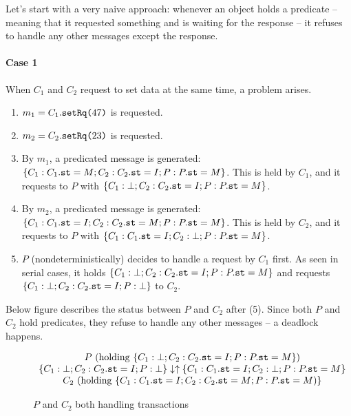 \documentclass[format=manuscript]{acmart}
\begin{document}
Let's start with a very naive approach: whenever an object holds a predicate --
meaning that it requested something and is waiting for the response -- it
refuses to handle any other messages except the response.

\paragraph{Case 1}\label{concurrent-case1}
When $C_1$ and $C_2$ request to set data at the same time, a problem arises.

\begin{enumerate}
\item $m_1 = C_1.\texttt{setRq(}47\texttt{)}$ is requested.
\item $m_2 = C_2.\texttt{setRq(}23\texttt{)}$ is requested.
\item By $m_1$, a predicated message is generated: $\{ C_1: C_1.\texttt{st} = M; C_2:
  C_2.\texttt{st} = I; P: P.\texttt{st} = M \}$. This is held by $C_1$, and it requests to
  $P$ with $\{ C_1: \bot; C_2: C_2.\texttt{st} = I; P: P.\texttt{st} = M \}$.
\item By $m_2$, a predicated message is generated: $\{ C_1: C_1.\texttt{st} = I; C_2:
  C_2.\texttt{st} = M; P: P.\texttt{st} = M \}$. This is held by $C_2$, and it requests to
  $P$ with $\{ C_1: C_1.\texttt{st} = I; C_2: \bot; P: P.\texttt{st} = M \}$.
\item $P$ (nondeterministically) decides to handle a request by $C_1$ first. As
  seen in serial cases, it holds $\{ C_1: \bot; C_2: C_2.\texttt{st} = I; P: P.\texttt{st}
  = M \}$ and requests $\{ C_1: \bot; C_2: C_2.\texttt{st} = I; P: \bot \}$ to $C_2$.
\end{enumerate}

Below figure describes the status between $P$ and $C_2$ after (5). Since both
$P$ and $C_2$ hold predicates, they refuse to handle any other messages -- a
deadlock happens.

\begin{figure}[h]
  \begin{math}
    \begin{array}{c}
      P\ (\textrm{holding}\ \{ C_1: \bot; C_2: C_2.\texttt{st} = I; P: P.\texttt{st} = M \}) \\
      \{ C_1: \bot; C_2: C_2.\texttt{st} = I; P: \bot \} \downarrow
      \uparrow \{ C_1: C_1.\texttt{st} = I; C_2: \bot; P: P.\texttt{st} = M \} \\
      C_2\ (\textrm{holding}\ \{ C_1: C_1.\texttt{st} = I; C_2: C_2.\texttt{st} = M; P: P.\texttt{st} = M) \}
    \end{array}
  \end{math}
  \caption{$P$ and $C_2$ both handling transactions}
\end{figure}
\end{document}
